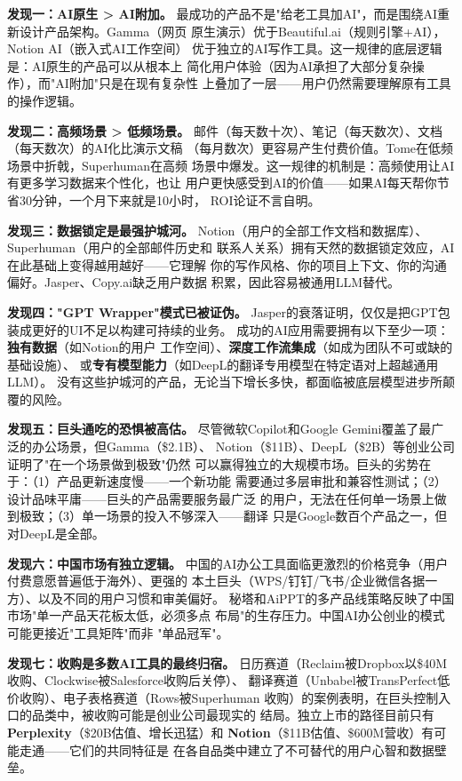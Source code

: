 \begin{corebox}[办公AI赛道的结构性规律]

\textbf{发现一：AI原生 > AI附加。}
最成功的产品不是"给老工具加AI"，而是围绕AI重新设计产品架构。Gamma（网页
原生演示）优于Beautiful.ai（规则引擎+AI），Notion AI（嵌入式AI工作空间）
优于独立的AI写作工具。这一规律的底层逻辑是：AI原生的产品可以从根本上
简化用户体验（因为AI承担了大部分复杂操作），而"AI附加"只是在现有复杂性
上叠加了一层——用户仍然需要理解原有工具的操作逻辑。

\textbf{发现二：高频场景 > 低频场景。}
邮件（每天数十次）、笔记（每天数次）、文档（每天数次）的AI化比演示文稿
（每月数次）更容易产生付费价值。Tome在低频场景中折戟，Superhuman在高频
场景中爆发。这一规律的机制是：高频使用让AI有更多学习数据来个性化，也让
用户更快感受到AI的价值——如果AI每天帮你节省30分钟，一个月下来就是10小时，
ROI论证不言自明。

\textbf{发现三：数据锁定是最强护城河。}
Notion（用户的全部工作文档和数据库）、Superhuman（用户的全部邮件历史和
联系人关系）拥有天然的数据锁定效应，AI在此基础上变得越用越好——它理解
你的写作风格、你的项目上下文、你的沟通偏好。Jasper、Copy.ai缺乏用户数据
积累，因此容易被通用LLM替代。

\textbf{发现四："GPT Wrapper"模式已被证伪。}
Jasper的衰落证明，仅仅是把GPT包装成更好的UI不足以构建可持续的业务。
成功的AI应用需要拥有以下至少一项：\textbf{独有数据}（如Notion的用户
工作空间）、\textbf{深度工作流集成}（如成为团队不可或缺的基础设施）、
或\textbf{专有模型能力}（如DeepL的翻译专用模型在特定语对上超越通用LLM）。
没有这些护城河的产品，无论当下增长多快，都面临被底层模型进步所颠覆的风险。

\textbf{发现五：巨头通吃的恐惧被高估。}
尽管微软Copilot和Google Gemini覆盖了最广泛的办公场景，但Gamma（\$2.1B）、
Notion（\$11B）、DeepL（\$2B）等创业公司证明了"在一个场景做到极致"仍然
可以赢得独立的大规模市场。巨头的劣势在于：（1）产品更新速度慢——一个新功能
需要通过多层审批和兼容性测试；（2）设计品味平庸——巨头的产品需要服务最广泛
的用户，无法在任何单一场景上做到极致；（3）单一场景的投入不够深入——翻译
只是Google数百个产品之一，但对DeepL是全部。

\textbf{发现六：中国市场有独立逻辑。}
中国的AI办公工具面临更激烈的价格竞争（用户付费意愿普遍低于海外）、更强的
本土巨头（WPS/钉钉/飞书/企业微信各据一方）、以及不同的用户习惯和审美偏好。
秘塔和AiPPT的多产品线策略反映了中国市场"单一产品天花板太低，必须多点
布局"的生存压力。中国AI办公创业的模式可能更接近"工具矩阵"而非
"单品冠军"。

\textbf{发现七：收购是多数AI工具的最终归宿。}
日历赛道（Reclaim被Dropbox以\$40M收购、Clockwise被Salesforce收购后关停）、
翻译赛道（Unbabel被TransPerfect低价收购）、电子表格赛道（Rows被Superhuman
收购）的案例表明，在巨头控制入口的品类中，被收购可能是创业公司最现实的
结局。独立上市的路径目前只有\textbf{Perplexity}（\$20B估值、增长迅猛）和
\textbf{Notion}（\$11B估值、\$600M营收）有可能走通——它们的共同特征是
在各自品类中建立了不可替代的用户心智和数据壁垒。
\end{corebox}

